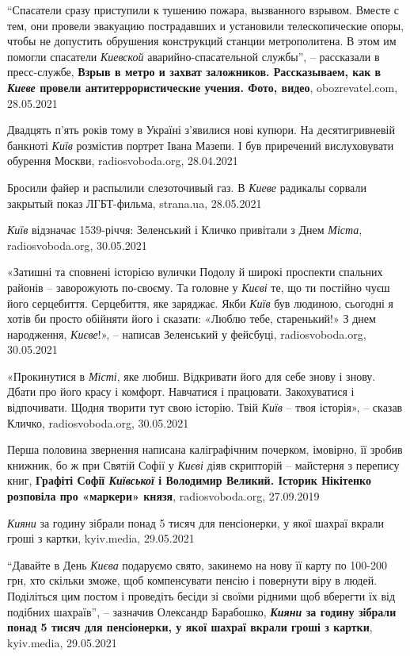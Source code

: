 \enquote{Спасатели сразу приступили к тушению пожара, вызванного взрывом.
Вместе с тем, они провели эвакуацию пострадавших и установили телескопические
опоры, чтобы не допустить обрушения конструкций станции метрополитена. В этом
им помогли спасатели \emph{Киевской} аварийно-спасательной службы}, –
рассказали в пресс-службе, \textbf{Взрыв в метро и захват заложников.
Рассказываем, как в \emph{Киеве} провели антитеррористические учения. Фото,
видео}, obozrevatel.com, 28.05.2021

Двадцять п'ять років тому в Україні з'явилися нові купюри. На десятигривневій
банкноті \emph{Київ} розмістив портрет Івана Мазепи. І був приречений
вислуховувати обурення Москви, radiosvoboda.org, 28.04.2021

Бросили файер и распылили слезоточивый газ. В \emph{Киеве} радикалы сорвали
закрытый показ ЛГБТ-фильма, strana.ua, 28.05.2021

\emph{Київ} відзначає 1539-річчя: Зеленський і Кличко привітали з Днем
\emph{Міста}, radiosvoboda.org, 30.05.2021

«Затишні та сповнені історією вулички Подолу й широкі проспекти спальних
районів – заворожують по-своєму. Та головне у \emph{Києві} те, що ти постійно
чуєш його серцебиття. Серцебиття, яке заряджає. Якби \emph{Київ} був людиною,
сьогодні я хотів би просто обійняти його і сказати: «Люблю тебе, старенький!» З
днем народження, \emph{Києве}!», – написав Зеленський у фейсбуці,
radiosvoboda.org, 30.05.2021

«Прокинутися в \emph{Місті}, яке любиш. Відкривати його для себе знову і знову.
Дбати про його красу і комфорт. Навчатися і працювати. Закохуватися і
відпочивати.  Щодня творити тут свою історію. Твій \emph{Київ} – твоя історія»,
– сказав Кличко, radiosvoboda.org, 30.05.2021

Перша половина звернення написана каліграфічним почерком, імовірно, її зробив
книжник, бо ж при Святій Софії у \emph{Києві} діяв скрипторій – майстерня з
перепису книг, \textbf{Графіті Софії \emph{Київської} і Володимир Великий.
Історик Нікітенко розповіла про «маркери» князя}, radiosvoboda.org, 27.09.2019

\emph{Кияни} за годину зібрали понад 5 тисяч для пенсіонерки, у якої шахраї
вкрали гроші з картки, kyiv.media, 29.05.2021

\enquote{Давайте в День \emph{Києва} подаруємо свято, закинемо на нову її карту
по 100-200 грн, хто скільки зможе, щоб компенсувати пенсію і повернути віру в
людей.  Поділіться цим постом і проведіть бесіди зі своїми рідними щоб вберегти
їх від подібних шахраїв}, – зазначив Олександр Барабошко, \textbf{\emph{Кияни}
за годину зібрали понад 5 тисяч для пенсіонерки, у якої шахраї вкрали гроші з
картки}, kyiv.media, 29.05.2021

